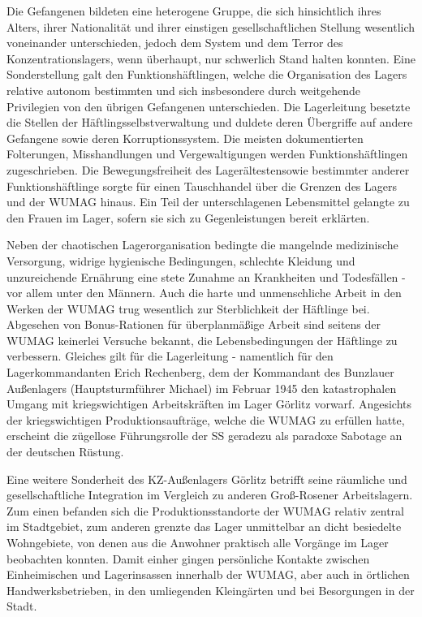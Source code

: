 \documentclass[a4paper,12pt,ngerman,
]{nisebook}
\begin{document}
Die Gefangenen bildeten eine heterogene Gruppe, die sich hinsichtlich ihres Alters, ihrer Nationalität und ihrer einstigen gesellschaftlichen Stellung wesentlich voneinander unterschieden, jedoch dem System und dem Terror des Konzentrationslagers, wenn überhaupt, nur schwerlich Stand halten konnten. Eine Sonderstellung galt den Funktionshäftlingen, welche die Organisation des Lagers relative autonom bestimmten und sich insbesondere durch weitgehende Privilegien von den übrigen Gefangenen unterschieden. Die Lagerleitung besetzte die Stellen der Häftlingsselbstverwaltung und duldete deren Übergriffe auf andere Gefangene sowie deren Korruptionssystem. Die meisten dokumentierten Folterungen, Misshandlungen und Vergewaltigungen werden Funktionshäftlingen zugeschrieben. Die Bewegungsfreiheit des Lagerältesten\linebreak\newpage sowie bestimmter anderer Funktionshäftlinge sorgte für einen Tauschhandel über die Grenzen des Lagers und der WUMAG hinaus. Ein Teil der unterschlagenen Lebensmittel gelangte zu den Frauen im Lager, sofern sie sich zu Gegenleistungen bereit erklärten. 

Neben der chaotischen Lagerorganisation bedingte die mangelnde medizinische Versorgung, widrige hygienische Bedingungen, schlechte Kleidung und unzureichende Ernährung eine stete Zunahme an Krankheiten und Todesfällen - vor allem unter den Männern. Auch die harte und unmenschliche Arbeit in den Werken der WUMAG trug wesentlich zur Sterblichkeit der Häftlinge bei. Abgesehen von Bonus-Rationen für überplanmäßige Arbeit sind seitens der WUMAG keinerlei Versuche bekannt, die Lebensbedingungen der Häftlinge zu verbessern. Gleiches gilt für die Lagerleitung - namentlich für den Lagerkommandanten Erich Rechenberg, dem der Kommandant des Bunzlauer Außenlagers (Hauptsturmführer Michael) im Februar 1945 den katastrophalen Umgang mit kriegswichtigen Arbeitskräften im Lager Görlitz vorwarf. Angesichts der kriegswichtigen Produktionsaufträge, welche die WUMAG zu erfüllen hatte, erscheint die zügellose Führungsrolle der SS geradezu als paradoxe Sabotage an der deutschen Rüstung. 

Eine weitere Sonderheit des KZ-Außenlagers Görlitz betrifft seine räumliche und gesellschaftliche Integration im Vergleich zu anderen Groß-Rosener Arbeitslagern. Zum einen befanden sich die Produktionsstandorte der WUMAG relativ zentral im Stadtgebiet, zum anderen grenzte das Lager unmittelbar an dicht besiedelte Wohngebiete, von denen aus die Anwohner praktisch alle Vorgänge im Lager beobachten konnten. Damit einher gingen persönliche Kontakte zwischen Einheimischen und Lagerinsassen innerhalb der WUMAG, aber auch in örtlichen Handwerksbetrieben, in den umliegenden Kleingärten und bei Besorgungen in der Stadt.     
\end{document}
